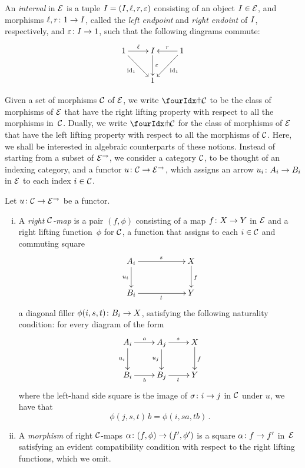 \documentclass[reqno,10pt,a4paper,oneside]{amsart}
\begin{document}
\begin{definition} An \emph{interval} in $\catE$ is a tuple $\interval = (\interval, \intervall, \intervalr, \varepsilon)$ consisting of  an object $\interval \in \catE$, 
and morphisms $\intervall, \intervalr \co \unit \to \interval$, called the \emph{left endpoint} and
\emph{right endoint} of $\interval$, respectively, 
 and $\intervalc \co \interval \to \unit$,   such that the following diagrams commute:
\[
\xymatrix{
\unit \ar[r]^\intervall \ar[dr]_{\id_\unit} & \interval \ar[d]^-{\varepsilon} & \unit \ar[dl]^{\id_\unit} \ar[l]_{\intervalr}  \\
 & \unit & }
 \]
\end{definition}

\medskip


Given a set of morphisms $\cal{C}$ of $\catE$, we 
write $\liftr{\cal{C}}$ to be the class of morphisms of $\catE$ that have 
the right lifting property with respect to all the morphisms in~$\cal{C}$. Dually, we write $\liftl{\cal{C}}$ for the class of morphisms of $\catE$ that have the left lifting property with respect to all the morphisms of $\cal{C}$. 
Here, we shall be interested in algebraic counterparts of these notions. Instead of starting from a subset of $\catE^\to$, we consider a category $\cal{C}$, to be thought of an indexing category, and a functor $u \co \cal{C} \to \catE^\to$, which assigns an arrow $u_i \co A_i \to B_i$ in $\catE$ to each index $i \in \cal{C}$.


 \begin{definition} Let $u \co \cal{C} \to \catE^\to$ be a functor. 
 \begin{enumerate}[(i)] 
 \item  A \emph{right $\cal{C}$-map}
 is a pair $(f, \phi)$ consisting of a map $f \co X \to Y$ in $\cal{E}$ and a right lifting function~$\phi$ for $\cal{C}$, \ie 
 a function that assigns to each $i \in \cal{C}$ and commuting square
\[
\xymatrix@C=2cm{
A_i \ar[r]^{s}   \ar[d]_{u_i} & X \ar[d]^f \\
B_i \ar[r]_{t} & Y}
\]
a diagonal filler $\phi(i,s, t) \co B_i \to X$, satisfying the following naturality 
condition: for every diagram of the form
\[
\xymatrix{
A_i \ar[r]^a \ar[d]_{u_i} & A_j \ar[r]^{s}  \ar[d]_{u_j} & X \ar[d]^f   \\
B_i \ar[r]_{b}  & B_j  \ar[r]_{t}  & Y }
\]
where the left-hand side square is the image of $\sigma \co i \to j$ in $\cal{C}$ under $u$, 
we have that 
\[
\phi(j, s, t) \, b = \phi(i, s  a, t  b) \, .
\]
\item A \emph{morphism} of right $\cal{C}$-maps $\alpha \co (f, \phi) \to (f', \phi')$ is a 
square $\alpha \co f \to f'$ in~$\catE$ satisfying an evident compatibility condition 
with respect to the right lifting functions, which we omit. 
\end{enumerate}
\end{definition}
\end{document}
